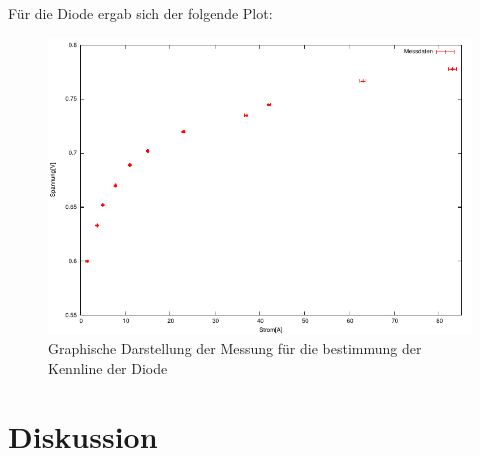 \documentclass[12pt]{scrartcl}
\begin{document}
Für die Diode ergab sich der folgende Plot:

\begin{figure}[htbp] 
	 \centering
	   \includegraphics[scale = 1]{Diode.pdf}
	 	\caption[Graphische Darstellung der Messung für die bestimmung der Kennline der Diode]{Graphische Darstellung der Messung für die bestimmung der Kennline der Diode}
	 \label{fig:aufgabe_6_a_plot}
\end{figure}

\newpage

\section{Diskussion}


\end{document}
